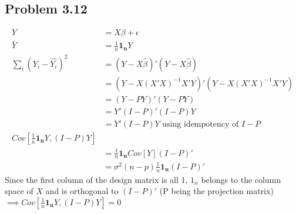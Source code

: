 \documentclass[a4paper]{article}
\begin{document}
\subsection*{Problem 3.12}

\begin{align*}
Y &= X\beta + \epsilon\\
\bar{Y} &= \frac{1}{n}\mathbf{1_n}Y\\
\sum_i(Y_i-\hat{Y_i})^2  &= (Y-X\hat{\beta})'(Y-X\hat{\beta})\\
&= (Y-X(X'X)^{-1}X'Y)'(Y-X(X'X)^{-1}X'Y)\\
&= (Y-PY)'(Y-PY)\\
&= Y'(I-P)'(I-P)Y\\
&= Y'(I-P)Y\text{ using idempotency of } I-P\\
Cov[\frac{1}{n}\mathbf{1_n}Y, (I-P)Y]\\
&= \frac{1}{n}\mathbf{1_n}Cov[Y](I-P)'\\
&= \sigma^2(n-p)\frac{1}{n}\mathbf{1_n}(I-P)'
\end{align*}
Since the first column of the design matrix is all 1, $1_n$ belongs to the column space of $X$  and is orthogonal to $(I-P)'$ (P being the projection matrix) $\implies Cov[\frac{1}{n}\mathbf{1_n}Y, (I-P)Y] = 0$
\end{document}
